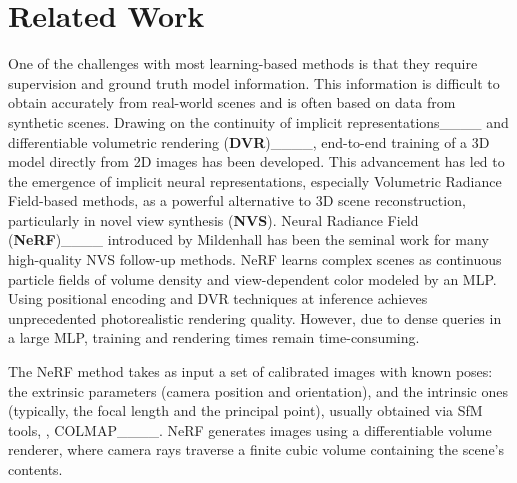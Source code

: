 \section{Related Work}
\label{sect:relatedwork}
One of the challenges with most learning-based methods is that they require supervision and ground truth model information. 
This information is difficult to obtain accurately from real-world scenes and is often based on data from synthetic scenes. 
Drawing on the continuity of implicit representations____ and differentiable volumetric rendering (\textbf{DVR})____, end-to-end training of a 3D model directly from 2D images has been developed. 
This advancement has led to the emergence of implicit neural representations, especially Volumetric Radiance Field-based methods, as a powerful alternative to 3D scene reconstruction, particularly in novel view synthesis (\textbf{NVS}).
Neural Radiance Field (\textbf{NeRF})____ introduced by Mildenhall \etal has been the seminal work for many high-quality NVS follow-up methods.
NeRF learns complex scenes as continuous particle fields of volume density and view-dependent color modeled by an MLP. Using positional encoding and DVR techniques at inference achieves unprecedented photorealistic rendering quality.
However, due to dense queries in a large MLP, training and rendering times remain time-consuming.

The NeRF method takes as input a set of calibrated images with known poses: the extrinsic parameters (camera position and orientation), and the intrinsic ones (typically, the focal length and the principal point), usually obtained via SfM tools, \eg, COLMAP____.
NeRF generates images using a differentiable volume renderer, where camera rays traverse a finite cubic volume containing the scene's contents.

